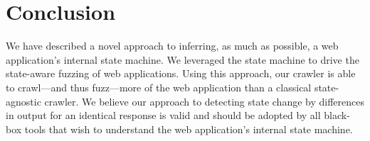 \section{Conclusion}

We have described a novel approach to inferring, as much as possible, a web
application's internal state machine. We leveraged the state machine to drive the
state-aware fuzzing of web applications. Using this approach, our crawler is
able to crawl---and thus fuzz---more of the web application than a classical
state-agnostic crawler. We believe our approach to detecting state change by
differences in output for an identical response is valid and should be adopted by
all black-box tools that wish to understand the web application's
internal state machine.




